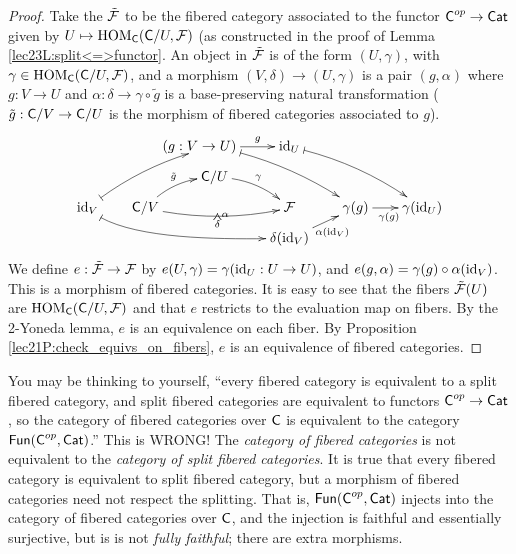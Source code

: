  \begin{proof}
   Take the $\tilde{\mathcal{F}}$ to be the fibered category associated to the functor $\text{\sf C}^{op}\to
   \text{\sf Cat}$ given by $U\mapsto \operatorname{HOM}_{\text{\sf C}}(\text{\sf C}/U,\mathcal{F})$ (as constructed in the proof of Lemma
   \ref{lec23L:split<=>functor}. An object in $\tilde{\mathcal{F}}$ is of the form $(U,\gamma)$,
   with $\gamma\in \operatorname{HOM}_{\text{\sf C}}(\text{\sf C}/U,\mathcal{F})$, and a morphism $(V,\delta)\to (U,\gamma)$ is a pair
   $(g,\alpha)$ where $g:V\to U$ and $\alpha:\delta\to \gamma\circ \tilde g$ is a
   base-preserving natural transformation ($\tilde g:\text{\sf C}/V\to \text{\sf C}/U$ is the morphism of
   fibered categories associated to $g$).
   \[\xymatrix@R-1.5pc @C-.5pc{
     & & \hspace{-5ex}(g:V\to U) \ar@{|->}@/^/[ddrr] \ar[r]^<>(.5){g} & \id_U \ar@{|->}@/^/[ddrr]\\
     & & \C/U \ar@/^/[dr]^\gamma \\
    \id_V \ar@{|->}@(dr,l)[drrr] \ar@{|->}@/^/[uurr] &\C/V \ar@/^/[ur]^{\tilde g} \ar@/_/[rr]_\delta^{}="a" & & \F &
    \gamma(g) \ar[r]_{\gamma(g)}& \gamma(\id_U)\\
    & & & \delta(\id_V) \ar[ur]_{\alpha(\id_V)}
    \ar@{=>}_\alpha "a";"a"+(0,.7)
   }\]
   We define $e:\tilde {\mathcal{F}}\to \mathcal{F}$ by $e(U,\gamma)= \gamma(\operatorname{id}_U:U\to U)$, and
   $e(g,\alpha) = \gamma(g)\circ \alpha(\operatorname{id}_V)$. This is a morphism of fibered
   categories. It is easy to see that the fibers $\tilde {\mathcal{F}}(U)$ are $\operatorname{HOM}_{\text{\sf C}}(\text{\sf C}/U,\mathcal{F})$
   and that $e$ restricts to the evaluation map on fibers. By the 2-Yoneda lemma, $e$ is
   an equivalence on each fiber. By Proposition \ref{lec21P:check_equivs_on_fibers}, $e$
   is an equivalence of fibered categories.
 \end{proof}
 \begin{warning}
   You may be thinking to yourself, ``every fibered category is equivalent to a split
   fibered category, and split fibered categories are equivalent to functors $\text{\sf C}^{op}\to
   \text{\sf Cat}$, so the category of fibered categories over $\text{\sf C}$ is equivalent to the category
   $\operatorname{\sf Fun}(\text{\sf C}^{op},\text{\sf Cat})$.'' This is WRONG! The \emph{category of fibered categories} is
   not equivalent to the \emph{category of split fibered categories}. It is true that
   every fibered category is equivalent to split fibered category, but a morphism of
   fibered categories need not respect the splitting. That is, $\operatorname{\sf Fun}(\text{\sf C}^{op},\text{\sf Cat})$
   injects into the category of fibered categories over $\text{\sf C}$, and the injection is
   faithful and essentially surjective, but is is not \emph{fully faithful}; there are
   extra morphisms.
 \end{warning}

